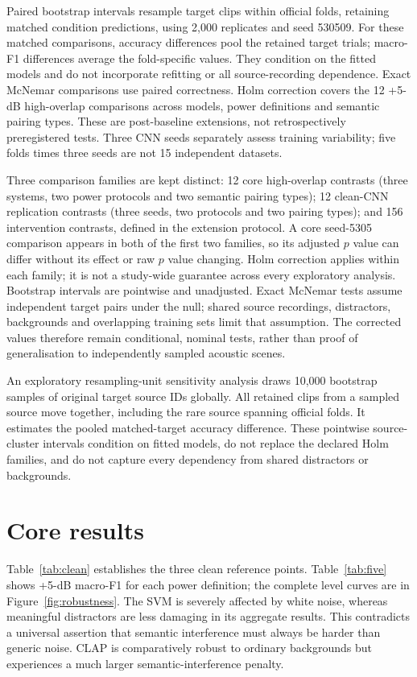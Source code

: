 \documentclass[a4paper,10pt]{article}
\begin{document}
Paired bootstrap intervals resample target clips within official folds,
retaining matched condition predictions, using 2,000 replicates and seed 530509.
For these matched comparisons, accuracy differences pool the retained target
trials; macro-F1 differences average the fold-specific values.
They condition on the fitted models and do not incorporate refitting or all
source-recording dependence. Exact McNemar comparisons use paired correctness.
Holm correction covers the 12 +5-dB high-overlap comparisons across models,
power definitions and semantic pairing types. These are post-baseline extensions,
not retrospectively preregistered tests. Three CNN seeds separately assess
training variability; five folds times three seeds are not 15 independent datasets.

Three comparison families are kept distinct: 12 core high-overlap contrasts
(three systems, two power protocols and two semantic pairing types); 12 clean-CNN
replication contrasts (three seeds, two protocols and two pairing types); and 156
intervention contrasts, defined in the extension protocol. A core seed-5305
comparison appears in both of the first two families, so its adjusted $p$ value
can differ without its effect or raw $p$ value changing. Holm correction applies
within each family; it is not a study-wide guarantee across every exploratory
analysis. Bootstrap intervals are pointwise and unadjusted. Exact McNemar tests
assume independent target pairs under the null; shared source recordings,
distractors, backgrounds and overlapping training sets limit that assumption.
The corrected values therefore remain conditional, nominal tests, rather than
proof of generalisation to independently sampled acoustic scenes.

An exploratory resampling-unit sensitivity analysis draws 10,000 bootstrap
samples of original target source IDs globally. All retained clips from a sampled
source move together, including the rare source spanning official folds. It
estimates the pooled matched-target accuracy difference. These pointwise source-
cluster intervals condition on fitted models, do not replace the declared Holm
families, and do not capture every dependency from shared distractors or backgrounds.

\section{Core results}

Table~\ref{tab:clean} establishes the three clean reference points. Table~\ref{tab:five}
shows +5-dB macro-F1 for each power definition; the complete level curves are
in Figure~\ref{fig:robustness}. The SVM is severely affected by white noise,
whereas meaningful distractors are less damaging in its aggregate results.
This contradicts a universal assertion that semantic interference must always
be harder than generic noise. CLAP is comparatively robust to ordinary
backgrounds but experiences a much larger semantic-interference penalty.
\end{document}
